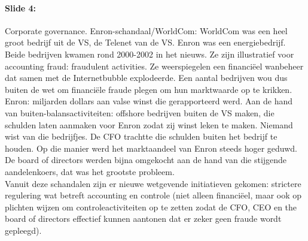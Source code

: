 \documentclass[10pt,a4paper]{report}
\begin{document}
\paragraph{Slide 4:}Corporate governance. Enron-schandaal/WorldCom: WorldCom was een heel groot bedrijf uit de VS, de Telenet van de VS. Enron was een energiebedrijf. Beide bedrijven kwamen rond 2000-2002 in het nieuws. Ze zijn illustratief voor accounting fraud: fraudulent activities. Ze weerspiegelen een financiëel wanbeheer dat samen met de Internetbubble explodeerde. Een aantal bedrijven wou dus buiten de wet om financiële fraude plegen om hun marktwaarde op te krikken. Enron: miljarden dollars aan valse winst die gerapporteerd werd. Aan de hand van buiten-balansactiviteiten: offshore bedrijven buiten de VS maken, die schulden laten aanmaken voor Enron zodat zij winst leken te maken. Niemand wist van die bedrijfjes. De CFO trachtte die schulden buiten het bedrijf te houden. Op die manier werd het marktaandeel van Enron steeds hoger geduwd. De board of directors werden bijna omgekocht aan de hand van die stijgende aandelenkoers, dat was het grootste probleem.\\
Vanuit deze schandalen zijn er nieuwe wetgevende initiatieven gekomen: strictere regulering wat betreft accounting en controle (niet alleen financiëel, maar ook op plichten wijzen om controleactiviteiten op te zetten zodat de CFO, CEO en the board of directors effectief kunnen aantonen dat er zeker geen fraude wordt gepleegd).
\end{document}
